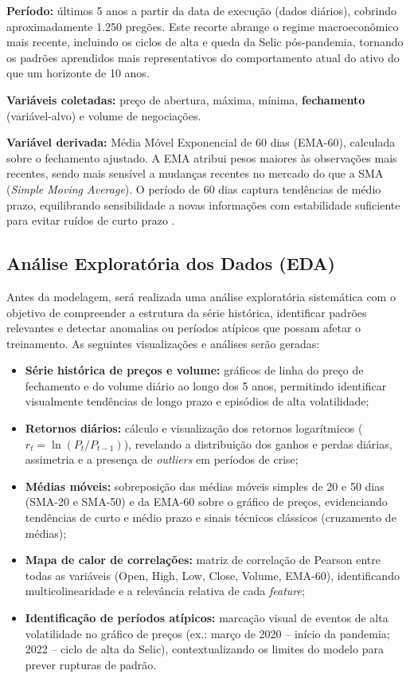 \documentclass[12pt]{article}
\begin{document}
\textbf{Período:} últimos 5 anos a partir da data de execução (dados diários),
cobrindo aproximadamente 1.250 pregões. Este recorte abrange o regime
macroeconômico mais recente, incluindo os ciclos de alta e queda da Selic
pós-pandemia, tornando os padrões aprendidos mais representativos do
comportamento atual do ativo do que um horizonte de 10 anos.

\textbf{Variáveis coletadas:} preço de abertura, máxima, mínima,
\textbf{fechamento} (variável-alvo) e volume de negociações.

\textbf{Variável derivada:} Média Móvel Exponencial de 60 dias (EMA-60),
calculada sobre o fechamento ajustado. A EMA atribui pesos maiores às
observações mais recentes, sendo mais sensível a mudanças recentes no mercado
do que a SMA (\textit{Simple Moving Average}). O período de 60 dias captura
tendências de médio prazo, equilibrando sensibilidade a novas informações
com estabilidade suficiente para evitar ruídos de curto prazo
\cite{zanotto:2026}.

\subsection{Análise Exploratória dos Dados (EDA)}

Antes da modelagem, será realizada uma análise exploratória sistemática com
o objetivo de compreender a estrutura da série histórica, identificar padrões
relevantes e detectar anomalias ou períodos atípicos que possam afetar o
treinamento. As seguintes visualizações e análises serão geradas:

\begin{itemize}
  \item \textbf{Série histórica de preços e volume:} gráficos de linha do
        preço de fechamento e do volume diário ao longo dos 5 anos,
        permitindo identificar visualmente tendências de longo prazo e
        episódios de alta volatilidade;
  \item \textbf{Retornos diários:} cálculo e visualização dos retornos
        logarítmicos ($r_t = \ln(P_t / P_{t-1})$), revelando a distribuição
        dos ganhos e perdas diárias, assimetria e a presença de
        \textit{outliers} em períodos de crise;
  \item \textbf{Médias móveis:} sobreposição das médias móveis simples de
        20 e 50 dias (SMA-20 e SMA-50) e da EMA-60 sobre o gráfico de
        preços, evidenciando tendências de curto e médio prazo e sinais
        técnicos clássicos (cruzamento de médias);
  \item \textbf{Mapa de calor de correlações:} matriz de correlação de
        Pearson entre todas as variáveis (Open, High, Low, Close, Volume,
        EMA-60), identificando multicolinearidade e a relevância relativa
        de cada \textit{feature};
  \item \textbf{Identificação de períodos atípicos:} marcação visual de
        eventos de alta volatilidade no gráfico de preços (ex.: março de
        2020 -- início da pandemia; 2022 -- ciclo de alta da Selic),
        contextualizando os limites do modelo para prever rupturas de
        padrão.
\end{itemize}
\end{document}
